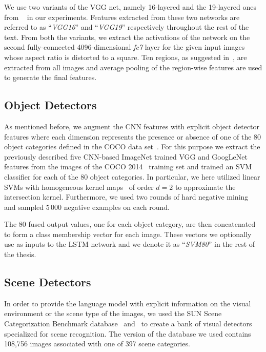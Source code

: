 We use two variants of the VGG net, namely 16-layered and the 19-layered ones
from ~\cite{Simonyan14c} in our experiments.
Features extracted from these two networks are referred to as ``\emph{VGG16}''
and ``\emph{VGG19}'' respectively throughout the rest of the text.
From both the variants, we extract the activations of the network on the second
fully-connected 4096-dimensional \emph{fc7} layer for the given input images
whose aspect ratio is distorted to a square.
Ten regions, as suggested in~\cite{Krizhevsky2012}, are extracted from all
images and average pooling of the region-wise features are used to generate the
final features.

\subsection{Object Detectors}
\label{subsec:svm80}

As mentioned before,  we augment the CNN features with explicit object detector
features where each dimension represents the presence or absence of one of the
80 object categories defined in the COCO data set~\cite{Lin2014}.
For this purpose we extract the previously described five CNN-based ImageNet
trained VGG and GoogLeNet features from the images of the COCO
2014~\cite{Lin2014} training set and trained an SVM classifier for each of the
80 object categories.
In particular, we here utilized linear SVMs with homogeneous kernel
maps~\cite{Vedaldi2010} of order $d=2$ to approximate the intersection kernel.
Furthermore, we used two rounds of hard negative mining~\cite{Li2013} and
sampled $5\,000$ negative examples on each round.

The 80 fused output values, one for each object category, are then concatenated
to form a class membership vector for each image.
These vectors we optionally use as inputs to the LSTM network and we denote it
as ``\emph{SVM80}'' in the rest of the thesis.

\subsection{Scene Detectors}

In order to provide the language model with explicit information on the visual
environment or the scene type of the images, we used the SUN Scene
Categorization Benchmark database~\cite{Xiao2010} and~\cite{Xiao2014} to create
a bank of visual detectors specialized for scene recognition.
The version of the database we used contains 108,756 images associated with one
of 397 scene categories.


